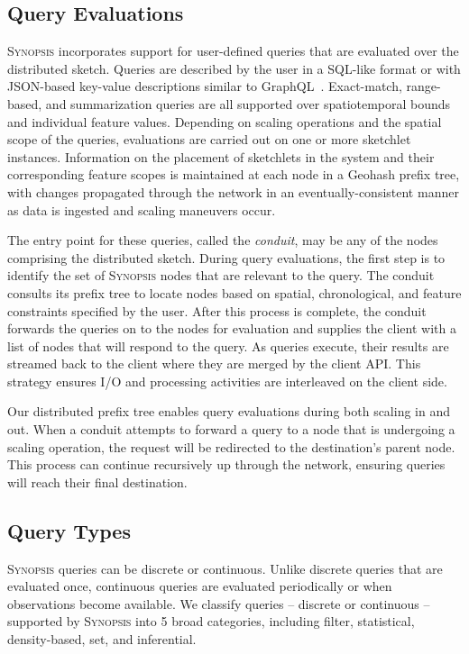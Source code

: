\subsection{Query Evaluations}
\label{subsec:query-eval}
\textsc{Synopsis} incorporates support for user-defined queries that are evaluated over the distributed sketch.  Queries are described by the user in a SQL-like format or with JSON-based key-value descriptions similar to GraphQL~\cite{graphql}. Exact-match, range-based, and summarization queries are all supported over spatiotemporal bounds and individual feature values. Depending on scaling operations and the spatial scope of the queries, evaluations are carried out on one or more sketchlet instances. Information on the placement of sketchlets in the system and their corresponding feature scopes is maintained at each node in a Geohash prefix tree, with changes propagated through the network in an eventually-consistent manner as data is ingested and scaling maneuvers occur.

The entry point for these queries, called the \emph{conduit}, may be any of the nodes comprising the distributed sketch. During query evaluations, the first step is to identify the set of \textsc{Synopsis} nodes that are relevant to the query. The conduit consults its prefix tree to locate nodes based on spatial, chronological, and feature constraints specified by the user. After this process is complete, the conduit forwards the queries on to the nodes for evaluation and supplies the client with a list of nodes that will respond to the query. As queries execute, their results are streamed back to the client where they are merged by the client API. This strategy ensures I/O and processing activities are interleaved on the client side.

Our distributed prefix tree enables query evaluations during both scaling in and out. When a conduit attempts to forward a query to a node that is undergoing a scaling operation, the request will be redirected to the destination's parent node. This process can continue recursively up through the network, ensuring queries will reach their final destination. \vspace{3em}

\subsection{Query Types}
\textsc{Synopsis} queries can be discrete or continuous. Unlike discrete queries that are evaluated once, continuous queries are evaluated periodically or when observations become available. We classify queries -- discrete or continuous -- supported by \textsc{Synopsis} into 5 broad categories, including filter, statistical, density-based, set, and inferential.


